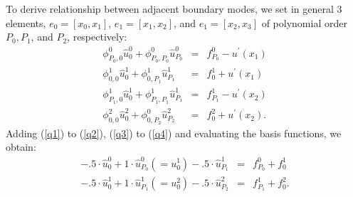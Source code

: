 To derive relationship between adjacent boundary modes, we set in
general 3 elements, $e_0=[x_0, x_1]$, $e_1=[x_1, x_2]$, and
$e_1=[x_2, x_3]$ of polynomial order $P_0, P_1$, and $P_2$,
respectively:
\begin{eqnarray}
\label{q1}  \phi_{P_0, 0}^0\hat u_0^0 + \phi_{P_0, P_0}^0 \hat u_{P_0}^0 &=& f_{P_0}^0 - u^{\prime}(x_1) \\
\label{q2}  \phi_{0, 0}^1\hat u_0^1 + \phi_{0, P_1}^1 \hat u_{P_1}^1     &=& f_{0}^1 + u^{\prime}(x_1) \\
\label{q3}  \phi_{P_1, 0}^1\hat u_0^1 + \phi_{P_1, P_1}^1 \hat u_{P_1}^1 &=& f_{P_1}^1 - u^{\prime}(x_2) \\
\label{q4}  \phi_{0, 0}^2\hat u_0^2 + \phi_{0, P_2}^0 \hat u_{P_2}^2     &=& f_{0}^2 + u^{\prime}(x_2).
\end{eqnarray}
Adding (\ref{q1}) to (\ref{q2}),  (\ref{q3}) to (\ref{q4}) and
evaluating the basis functions, we obtain:
\begin{eqnarray}
\label{q5}  -.5 \cdot \hat u_0^0 + 1 \cdot \hat u_{P_0}^0(=u_0^1) -.5 \cdot \hat u_{P_1}^1 &=& f_{P_0}^0 + f_{0}^1 \\
\label{q6}  -.5 \cdot \hat u_0^1 + 1 \cdot \hat u_{P_1}^1(=u_0^2) -.5 \cdot \hat u_{P_2}^2 &=& f_{P_1}^1 + f_{0}^2.
\end{eqnarray}

